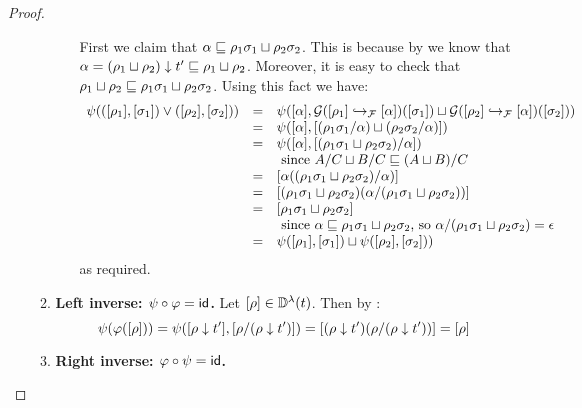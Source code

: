 \begin{proof}
\begin{enumerate}
\begin{enumerate}
\begin{enumerate}
      First we claim that $\alpha \sqsubseteq \rho_1\sigma_1 \sqcup \rho_2\sigma_2$.
      This is because by 
      we know that $\alpha = (\rho_1 \sqcup \rho_2) \downarrow t' \sqsubseteq \rho_1 \sqcup \rho_2$.
      Moreover, it is easy to check that
      $\rho_1 \sqcup \rho_2 \sqsubseteq \rho_1\sigma_1 \sqcup \rho_2\sigma_2$.
      Using this fact we have:
      \[
      \begin{array}{rcll}
        \psi(({[\rho_1]},{[\sigma_1]}) \lor ({[\rho_2]},{[\sigma_2]}))
      & = &
        \psi({[\alpha]},\mathcal{G}({[\rho_1]} \hookrightarrow_{\mathcal{F}} {[\alpha]})({[\sigma_1]}) \sqcup \mathcal{G}({[\rho_2]} \hookrightarrow_{\mathcal{F}} {[\alpha]})({[\sigma_2]}))
      \\
      & = &
        \psi({[\alpha]}, {[(\rho_1\sigma_1/\alpha) \sqcup (\rho_2\sigma_2/\alpha)]})
      \\
      & = &
        \psi({[\alpha]}, {[(\rho_1\sigma_1 \sqcup \rho_2\sigma_2)/\alpha]})
      \\&&\text{ since $A/C \sqcup B/C \sqsubseteq (A \sqcup B)/C$} \\
      & = &
        {[\alpha((\rho_1\sigma_1 \sqcup \rho_2\sigma_2)/\alpha)]} \\
      & = &
        {[(\rho_1\sigma_1 \sqcup \rho_2\sigma_2)(\alpha/(\rho_1\sigma_1 \sqcup \rho_2\sigma_2))]} \\
      & = &
        {[\rho_1\sigma_1 \sqcup \rho_2\sigma_2]}
        \\&&\text{ since
                     $\alpha \sqsubseteq \rho_1\sigma_1 \sqcup \rho_2\sigma_2$,
                   so $\alpha/(\rho_1\sigma_1 \sqcup \rho_2\sigma_2) = \epsilon$} \\
      & = &
        \psi({[\rho_1]},{[\sigma_1]}) \sqcup \psi({[\rho_2]},{[\sigma_2]}))
      \end{array}
      \]
      as required.
    \end{enumerate}
  \item {\bf Left inverse: $\psi \circ \varphi = \mathsf{id}$.}
    Let ${[\rho]} \in \mathbb{D}^{\lambda}(t)$.
    Then by :
    \[
      \psi(\varphi({[\rho]}))
      = \psi({[\rho \downarrow t']}, {[\rho/(\rho \downarrow t')]})
      = {[(\rho \downarrow t')(\rho/(\rho \downarrow t'))]}
      = {[\rho]}
    \]
  \item {\bf Right inverse: $\varphi \circ \psi = \mathsf{id}$.}

\end{enumerate}
\end{enumerate}
\end{proof}
